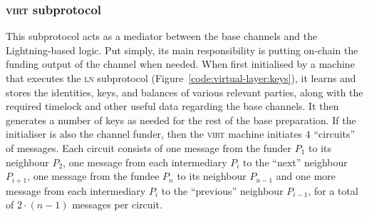   \subsubsection{\textsc{virt} subprotocol}
  \label{construction:virt}
  This subprotocol acts as a mediator between the base channels and the
  Lightning-based logic. Put simply, its main responsibility is putting on-chain
  the funding output of the channel when needed. When first initialised by a
  machine that executes the \textsc{ln} subprotocol
  (Figure~\ref{code:virtual-layer:keys}), it learns and stores the identities,
  keys, and balances of various relevant parties, along with the required
  timelock and other useful data regarding the base channels. It then generates
  a number of keys as needed for the rest of the base preparation. If the
  initialiser is also the channel funder, then the \textsc{virt} machine
  initiates $4$ ``circuits'' of messages. Each circuit consists of one message
  from the funder $P_1$ to its neighbour $P_2$, one message from each
  intermediary $P_i$ to the ``next'' neighbour $P_{i+1}$, one message from the
  fundee $P_n$ to its neighbour $P_{n-1}$ and one more message from each
  intermediary $P_i$ to the ``previous'' neighbour $P_{i-1}$, for a total of
  $2\cdot(n-1)$ messages per circuit.

